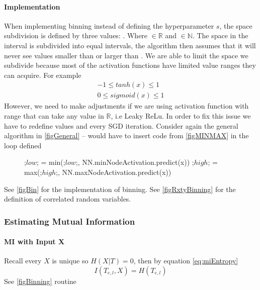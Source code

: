 \documentclass[dissertation.tex]{subfiles}
\begin{document}
\paragraph{Implementation} When implementing binning instead of defining the
hyperparameter $s$, the space subdivision is defined by three values:
. Where 
$\in{\mathbb{R}}$ and
$\in{\mathbb{N}}$.
The space in the interval  is subdivided into
 equal intervals, the algorithm then assumes that it will never
see values smaller than  or larger than .     We
are able to limit the space we subdivide because most of the activation
functions have limited value ranges they can acquire. For example
\begin{gather}
  -1 \leq tanh(x) \leq 1\\
  0 \leq sigmoid(x) \leq 1
\end{gather}
However, we need to make adjustments if we are using activation function with
range that can take any value in $\mathbb{R}$, i.e Leaky ReLu. In order to fix
this issue we have to redefine values  and  every
SGD iteration. Consider again the general algorithm in \autoref{figGeneral} --
would have to insert code from \autoref{figMINMAX} in the loop defined
\begin{figure}[H]
  \begin{pythonfigure}
        ;$low$; = min(;$low$;, NN.minNodeActivation.predict(x))
        ;$high$; = max(;$high$;, NN.maxNodeActivation.predict(x))
  \end{pythonfigure}
  \label{figMINMAX}
\end{figure}
See \autoref{figBin} for the implementation of binning. See
\autoref{figRxtyBinning} for the definition of correlated random variables.

\subsubsection{Estimating Mutual Information}

\paragraph{MI with Input X}
Recall every $X$ is unique so $H(X|T)=0$, then by equation
\autoref{eq:miEntropy}
\begin{equation}
  I(T_{e,l}, X) = H(T_{e,l})
\end{equation}
See \autoref{figBinning} routine 
\end{document}
